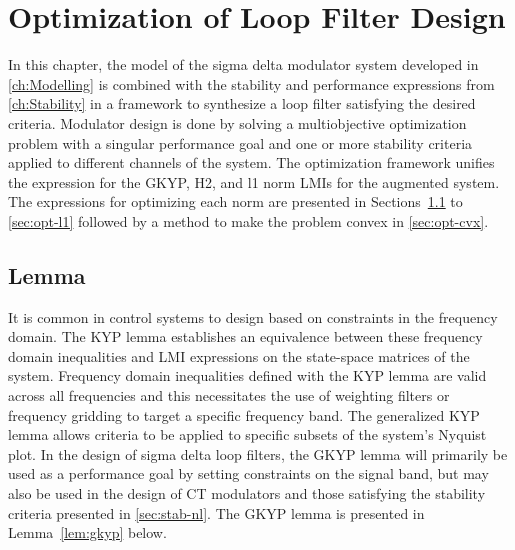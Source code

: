 
\chapter{Optimization of Loop Filter Design}
\label{ch:Optimization}

In this chapter, the model of the sigma delta modulator system developed in \autoref{ch:Modelling} is combined with the stability and performance expressions from \autoref{ch:Stability} in a framework to synthesize a loop filter satisfying the desired criteria. Modulator design is done by solving a multiobjective optimization problem with a singular performance goal and one or more stability criteria applied to different channels of the system. The optimization framework unifies the expression for the \gls{GKYP}, \gls{H2}, and \gls{l1} norm \gls{LMI}s for the augmented system. The expressions for optimizing each norm are presented in Sections~\ref{sec:opt-gkyp} to \ref{sec:opt-l1} followed by a method to make the problem convex in \autoref{sec:opt-cvx}.

\section{ Lemma}
\label{sec:opt-gkyp}

It is common in control systems to design based on constraints in the frequency domain. The KYP lemma establishes an equivalence between these frequency domain inequalities and \gls{LMI} expressions on the state-space matrices of the system. Frequency domain inequalities defined with the KYP lemma are valid across all frequencies and this necessitates the use of weighting filters or frequency gridding to target a specific frequency band. The generalized KYP lemma allows criteria to be applied to specific subsets of the system's Nyquist plot. In the design of sigma delta loop filters, the \gls{GKYP} lemma will primarily be used as a performance goal by setting constraints on the signal band, but may also be used in the design of \gls{CT} modulators and those satisfying the stability criteria presented in \autoref{sec:stab-nl}. The \gls{GKYP} lemma is presented in Lemma~\ref{lem:gkyp} below.

